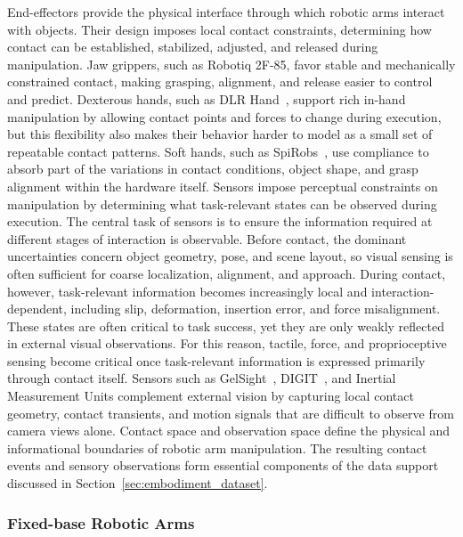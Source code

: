 \documentclass[acmsmall,screen,review]{acmart}
\begin{document}
End-effectors provide the physical interface through which robotic arms interact with objects.
Their design imposes local contact constraints, determining how contact can be established, stabilized, adjusted, and released during manipulation.
Jaw grippers, such as Robotiq 2F-85, favor stable and mechanically constrained contact, making grasping, alignment, and release easier to control and predict.
Dexterous hands, such as DLR Hand~\cite{butterfass2001dlrhand}, support rich in-hand manipulation by allowing contact points and forces to change during execution, but this flexibility also makes their behavior harder to model as a small set of repeatable contact patterns.
Soft hands, such as SpiRobs~\cite{lee2023spirobs}, use compliance to absorb part of the variations in contact conditions, object shape, and grasp alignment within the hardware itself.
Sensors impose perceptual constraints on manipulation by determining what task-relevant states can be observed during execution.
The central task of sensors is to ensure the information required at different stages of interaction is observable.
Before contact, the dominant uncertainties concern object geometry, pose, and scene layout, so visual sensing is often sufficient for coarse localization, alignment, and approach. 
During contact, however, task-relevant information becomes increasingly local and interaction-dependent, including slip, deformation, insertion error, and force misalignment. 
These states are often critical to task success, yet they are only weakly reflected in external visual observations. 
For this reason, tactile, force, and proprioceptive sensing become critical once task-relevant information is expressed primarily through contact itself. 
Sensors such as GelSight~\cite{yuan2017gelsight}, DIGIT~\cite{mike2020digit}, and Inertial Measurement Units complement external vision by capturing local contact geometry, contact transients, and motion signals that are difficult to observe from camera views alone.
Contact space and observation space define the physical and informational boundaries of robotic arm manipulation.
The resulting contact events and sensory observations form essential components of the data support discussed in Section~\ref{sec:embodiment_dataset}.

\subsubsection{Fixed-base Robotic Arms}\label{subsec:manipulators}
\end{document}
